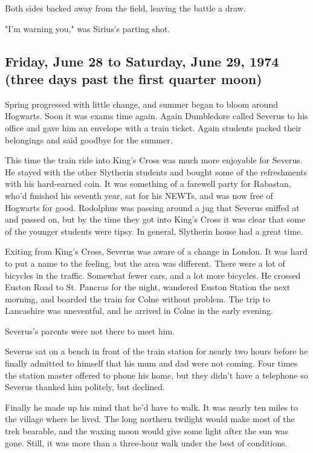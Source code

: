 Both sides backed away from the field, leaving the battle a draw.

"I'm warning you," was Sirius's parting shot.

\subsection{Friday, June 28 to Saturday, June 29, 1974 (three days past the first quarter moon)}

Spring progressed with little change, and summer began to bloom around Hogwarts. Soon it was exams time again. Again Dumbledore called Severus to his office and gave him an envelope with a train ticket. Again students packed their belongings and said goodbye for the summer.

This time the train ride into King's Cross was much more enjoyable for Severus. He stayed with the other Slytherin students and bought some of the refreshments with his hard-earned coin. It was something of a farewell party for Rabastan, who'd finished his seventh year, sat for his NEWTs, and was now free of Hogwarts for good. Rodolphus was passing around a jug that Severus sniffed at and passed on, but by the time they got into King's Cross it was clear that some of the younger students were tipsy. In general, Slytherin house had a great time.

Exiting from King's Cross, Severus was aware of a change in London. It was hard to put a name to the feeling, but the area was different. There were a lot of bicycles in the traffic. Somewhat fewer cars, and a lot more bicycles. He crossed Euston Road to St. Pancras for the night, wandered Euston Station the next morning, and boarded the train for Colne without problem. The trip to Lancashire was uneventful, and he arrived in Colne in the early evening.

Severus's parents were not there to meet him.

Severus sat on a bench in front of the train station for nearly two hours before he finally admitted to himself that his mum and dad were not coming. Four times the station master offered to phone his home, but they didn't have a telephone so Severus thanked him politely, but declined.

Finally he made up his mind that he'd have to walk. It was nearly ten miles to the village where he lived. The long northern twilight would make most of the trek bearable, and the waxing moon would give some light after the sun was gone. Still, it was more than a three-hour walk under the best of conditions.

